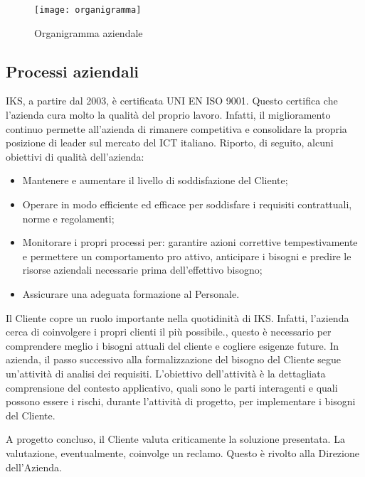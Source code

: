 \begin{figure}[htbp]
	\begin{center}
		\texttt{[image: organigramma]}
		\caption{Organigramma aziendale}
	\end{center}
\end{figure}



\subsection{Processi aziendali}

IKS, a partire dal 2003, è certificata UNI EN ISO 9001. Questo certifica che 
l'azienda cura molto la qualità del proprio lavoro. Infatti, il miglioramento 
continuo permette all'azienda di rimanere competitiva e consolidare 
la propria posizione di leader sul mercato del ICT italiano. Riporto, di seguito, 
alcuni obiettivi di qualità dell'azienda:

\begin{itemize}
	\item Mantenere e aumentare il livello di soddisfazione del Cliente;
	\item Operare in modo efficiente ed efficace per soddisfare i requisiti 
		  contrattuali, norme e regolamenti;
	\item Monitorare i propri processi per: garantire azioni correttive 
	      tempestivamente e permettere un comportamento pro attivo, 
	      anticipare i bisogni e predire le risorse aziendali necessarie 
	      prima dell'effettivo bisogno; 
	\item Assicurare una adeguata formazione al Personale.
\end{itemize}


Il Cliente copre un ruolo importante nella quotidinità di IKS. Infatti, 
l'azienda cerca di coinvolgere i propri clienti il più possibile., questo 
è necessario per comprendere meglio i bisogni attuali del cliente e 
cogliere esigenze future. 
In azienda, il passo successivo alla formalizzazione del bisogno del 
Cliente segue un'attività di analisi dei requisiti. L'obiettivo 
dell'attività è la dettagliata comprensione del contesto applicativo, 
quali sono le parti interagenti e quali possono essere i rischi, durante 
l'attività di progetto, per implementare i bisogni del Cliente.

A progetto concluso, il Cliente valuta criticamente la soluzione 
presentata. La valutazione, eventualmente, coinvolge un reclamo. Questo 
è rivolto alla Direzione dell'Azienda.

